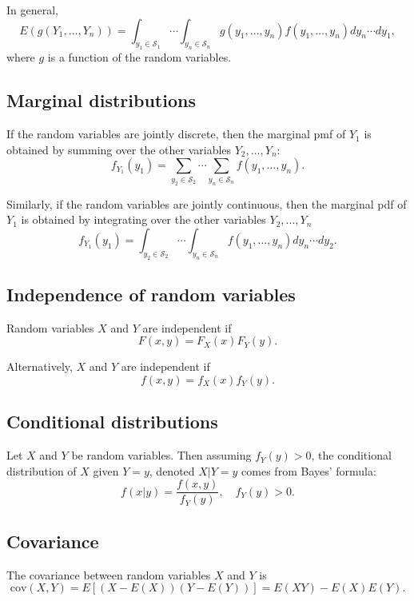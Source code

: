 \documentclass[
]{book}
\theoremstyle{definition}
\theoremstyle{definition}
\theoremstyle{definition}
\theoremstyle{definition}
\theoremstyle{remark}
\begin{document}
In general,
\[
E(g(Y_1,\ldots,Y_n))=\int_{y_1\in\mathcal{S}_1} \cdots \int_{y_n\in\mathcal{S}_n} g(y_1, \ldots, y_n) f(y_1,\ldots,y_n) dy_n \cdots dy_1,
\]
where \(g\) is a function of the random variables.

\hypertarget{marginal-distributions}{%
\subsection{Marginal distributions}\label{marginal-distributions}}

If the random variables are jointly discrete, then the marginal pmf of \(Y_1\) is obtained by summing over the other variables \(Y_2, ..., Y_n\):
\[f_{Y_1}(y_1)=\sum_{y_2\in\mathcal{S}_2}\cdots \sum_{y_n\in\mathcal{S}_n} f(y_1,\ldots,y_n).\]

Similarly, if the random variables are jointly continuous, then the marginal pdf of \(Y_1\) is obtained by integrating over the other variables \(Y_2, ..., Y_n\)
\[f_{Y_1}(y_1)=\int_{y_2\in\mathcal{S}_2}\cdots \int_{y_n\in\mathcal{S}_n} f(y_1,\ldots,y_n) dy_n \cdots dy_2.
\]

\hypertarget{independence-of-random-variables}{%
\subsection{Independence of random variables}\label{independence-of-random-variables}}

Random variables \(X\) and \(Y\) are independent if
\[F(x, y) = F_X(x) F_Y(y).\]

Alternatively, \(X\) and \(Y\) are independent if
\[f(x, y) = f_X(x)f_Y(y).\]

\hypertarget{conditional-distributions}{%
\subsection{Conditional distributions}\label{conditional-distributions}}

Let \(X\) and \(Y\) be random variables. Then assuming \(f_Y(y)>0\), the conditional distribution of \(X\) given \(Y = y\), denoted \(X|Y=y\) comes from Bayes' formula:
\[f(x|y) = \frac{f(x, y)}{f_{Y}(y)}, \quad f_Y(y)>0.\]

\hypertarget{covariance}{%
\subsection{Covariance}\label{covariance}}

The covariance between random variables \(X\) and \(Y\) is
\[\mathrm{cov}(X,Y)=E[(X-E(X))(Y-E(Y))]=E(XY)-E(X)E(Y).\]
\end{document}
